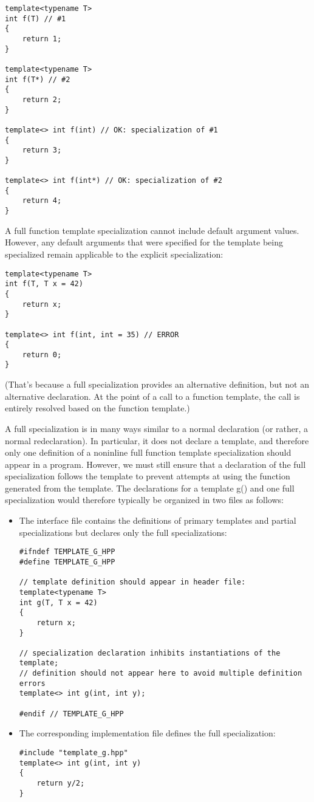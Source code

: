 \begin{lstlisting}[style=styleCXX]
template<typename T>
int f(T) // #1
{
	return 1;
}

template<typename T>
int f(T*) // #2
{
	return 2;
}

template<> int f(int) // OK: specialization of #1
{
	return 3;
}

template<> int f(int*) // OK: specialization of #2
{
	return 4;
}
\end{lstlisting}

A full function template specialization cannot include default argument values. However, any default arguments that were specified for the template being specialized remain applicable to the explicit specialization:

\begin{lstlisting}[style=styleCXX]
template<typename T>
int f(T, T x = 42)
{
	return x;
}

template<> int f(int, int = 35) // ERROR
{
	return 0;
}
\end{lstlisting}

(That’s because a full specialization provides an alternative definition, but not an alternative declaration. At the point of a call to a function template, the call is entirely resolved based on the function template.)

A full specialization is in many ways similar to a normal declaration (or rather, a normal redeclaration). In particular, it does not declare a template, and therefore only one definition of a noninline full function template specialization should appear in a program. However, we must still ensure that a declaration of the full specialization follows the template to prevent attempts at using the function generated from the template. The declarations for a template g() and one full specialization would therefore typically be organized in two files as follows:

\begin{itemize}
\item 
The interface file contains the definitions of primary templates and partial specializations but declares only the full specializations:

\begin{lstlisting}[style=styleCXX]
#ifndef TEMPLATE_G_HPP
#define TEMPLATE_G_HPP

// template definition should appear in header file:
template<typename T>
int g(T, T x = 42)
{
	return x;
}

// specialization declaration inhibits instantiations of the template;
// definition should not appear here to avoid multiple definition errors
template<> int g(int, int y);

#endif // TEMPLATE_G_HPP
\end{lstlisting}

\item 
The corresponding implementation file defines the full specialization:

\begin{lstlisting}[style=styleCXX]
#include "template_g.hpp"
template<> int g(int, int y)
{
	return y/2;
}
\end{lstlisting}
\end{itemize}


